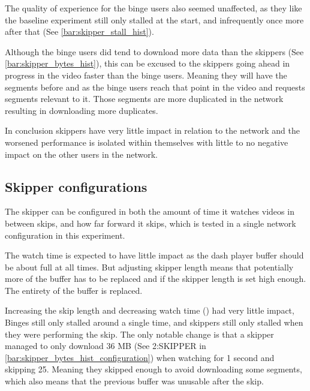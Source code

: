 

The quality of experience for the binge users also seemed unaffected, as they like the baseline experiment still only stalled at the start, and infrequently once more after that (See \autoref{bar:skipper_stall_hist}). 



Although the binge users did tend to download more data than the skippers (See \autoref{bar:skipper_bytes_hist}), this can be excused to the skippers going ahead in progress in the video faster than the binge users. Meaning they will have the segments before and as the binge users reach that point in the video and requests segments relevant to it. Those segments are more duplicated in the network resulting in downloading more duplicates.




In conclusion skippers have very little impact in relation to the network and the worsened performance is isolated within themselves with little to no negative impact on the other users in the network.

\subsection{Skipper configurations}
The skipper can be configured in both the amount of time it watches videos in between skips, and how far forward it skips, which is tested in a single network configuration in this experiment.

The watch time is expected to have little impact as the dash player buffer should be about full at all times. But adjusting skipper length means that potentially more of the buffer has to be replaced and if the skipper length is set high enough. The entirety of the buffer is replaced. %

Increasing the skip length and decreasing watch time () had very little impact, Binges still only stalled around a single time, and skippers still only stalled when they were performing the skip. The only notable change is that a skipper managed to only download 36 \ac{MB} (See 2:SKIPPER in \autoref{bar:skipper_bytes_hist_configuration}) when watching for 1 second and skipping 25. Meaning they skipped enough to avoid downloading some segments, which also means that the previous buffer was unusable after the skip. 

